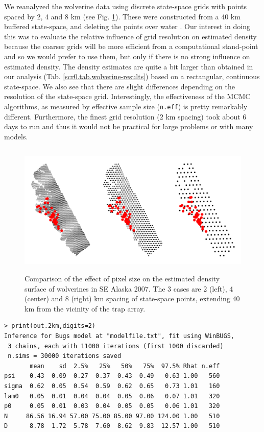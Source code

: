 {{We reanalyzed the wolverine data using discrete state-space grids with
points spaced by 2, 4 and 8 km (see 
Fig. \ref{scr0.fig.wolvgrids}). These were constructed from a 40 km
buffered state-space, and deleting the points over water 
\citep[see][]{royle_etal:2011jwm}.  Our interest in doing this was to
evaluate the relative influence of grid resolution on estimated
density because the coarser grids will be more efficient from a
computational stand-point and so we would prefer to use them, but
only if there is no strong influence on estimated density.
The density estimates are quite a bit larger than obtained in our
analysis 
(Tab. \ref{scr0.tab.wolverine-results})
based on a rectangular, continuous state-space. 
We also see that there are slight differences depending on the
resolution of the state-space grid.
Interestingly, the 
effectiveness of the MCMC algorithms, as measured by effective sample
size (\mbox{\tt n.eff}) is pretty remarkably
different. Furthermore, the finest grid resolution ($2$ km spacing) took about
6 days to run and thus it would not be practical for large problems or
with many models.

\begin{figure}[ht]
\begin{center}
\includegraphics[height=2.5in,width=5in]{Ch4-SCR0/figs/wolvgrids}
\end{center}
\caption{Comparison of the effect of pixel size on the estimated
  density surface of wolverines in SE Alaska 2007. The 3 cases are 
2 (left), 4 (center) and 8 (right) km spacing of state-space points, extending 
40 km from the vicinity of the trap array. }
\label{scr0.fig.wolvgrids}
\end{figure}

{\small
\begin{verbatim}
> print(out.2km,digits=2)
Inference for Bugs model at "modelfile.txt", fit using WinBUGS,
 3 chains, each with 11000 iterations (first 1000 discarded)
 n.sims = 30000 iterations saved
       mean    sd  2.5%   25%   50%   75%  97.5% Rhat n.eff
psi    0.43  0.09  0.27  0.37  0.43  0.49   0.63 1.00   560
sigma  0.62  0.05  0.54  0.59  0.62  0.65   0.73 1.01   160
lam0   0.05  0.01  0.04  0.04  0.05  0.06   0.07 1.01   320
p0     0.05  0.01  0.03  0.04  0.05  0.05   0.06 1.01   320
N     86.56 16.94 57.00 75.00 85.00 97.00 124.00 1.00   510
D      8.78  1.72  5.78  7.60  8.62  9.83  12.57 1.00   510


\end{verbatim}}}}

